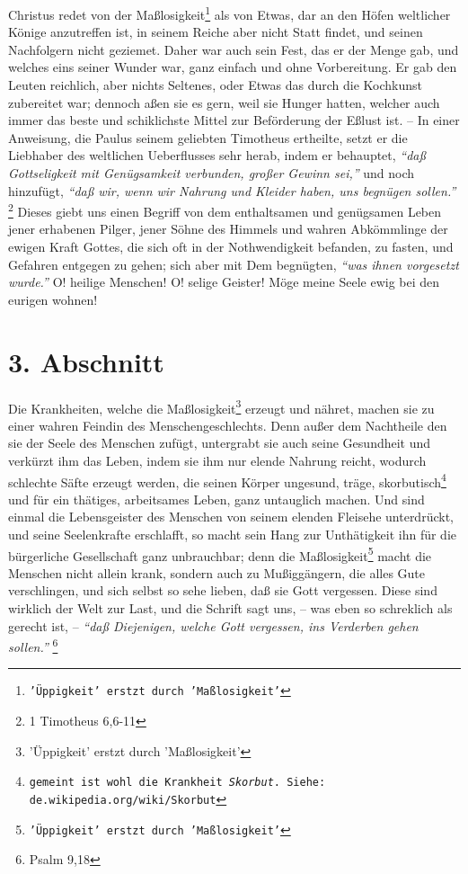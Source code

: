 \medskip

Christus redet von der Maßlosigkeit\footnote{\texttt{'Üppigkeit' erstzt durch 'Maßlosigkeit'}} als von Etwas, dar an den Höfen weltlicher
Könige anzutreffen ist, in seinem Reiche aber nicht Statt findet, und seinen
Nachfolgern nicht geziemet. Daher war auch sein Fest, das er der Menge gab, und
welches eins seiner Wunder war, ganz einfach und ohne Vorbereitung. Er gab den
Leuten reichlich, aber nichts Seltenes, oder Etwas das durch die Kochkunst
zubereitet war; dennoch aßen sie es gern, weil sie Hunger hatten, welcher auch
immer das beste und schiklichste Mittel zur Beförderung der Eßlust ist. -- In
einer Anweisung, die Paulus seinem geliebten Timotheus ertheilte, setzt er die
Liebhaber des weltlichen Ueberflusses sehr herab, indem er behauptet,
\textit{"`daß Gottseligkeit mit Genügsamkeit verbunden, großer Gewinn sei,"'} und noch hinzufügt, \textit{"`daß wir, wenn wir Nahrung und Kleider haben, uns begnügen
sollen."'}
\footnote{1 Timotheus 6,6-11}
Dieses giebt uns einen Begriff von dem
enthaltsamen und genügsamen Leben jener erhabenen Pilger, jener Söhne des Himmels und wahren Abkömmlinge der ewigen Kraft Gottes, die sich oft in der
Nothwendigkeit befanden, zu fasten, und Gefahren entgegen zu gehen; sich aber
mit Dem begnügten, \textit{"`was ihnen vorgesetzt wurde."'} O! heilige Menschen! O!
selige Geister! Möge meine Seele ewig bei den eurigen wohnen!

\section{3. Abschnitt} \label{kap14_ab3}

Die Krankheiten, welche die Maßlosigkeit\footnote{'Üppigkeit' erstzt durch 'Maßlosigkeit'} erzeugt und nähret, machen sie zu einer
wahren Feindin des Menschengeschlechts. Denn außer dem Nachtheile den sie der
Seele des Menschen zufügt, untergrabt sie auch seine Gesundheit und verkürzt ihm
das Leben, indem sie ihm nur elende Nahrung reicht, wodurch schlechte Säfte
erzeugt werden, die seinen Körper ungesund, träge, skorbutisch\footnote{\texttt{gemeint ist
wohl die Krankheit \textit{Skorbut}. Siehe: de.wikipedia.org/wiki/Skorbut}} und für ein thätiges,
arbeitsames Leben, ganz untauglich machen. Und sind einmal die Lebensgeister des
Menschen von seinem elenden Fleisehe unterdrückt, und seine Seelenkrafte
erschlafft, so macht sein Hang zur Unthätigkeit ihn für die bürgerliche Gesellschaft ganz unbrauchbar; denn die Maßlosigkeit\footnote{\texttt{'Üppigkeit' erstzt durch 'Maßlosigkeit'}} macht die Menschen nicht
allein krank, sondern auch zu Mußiggängern, die alles Gute verschlingen, und
sich selbst so sehe lieben, daß sie Gott vergessen. Diese sind wirklich der Welt
zur Last, und die Schrift sagt uns, -- was eben so schreklich als gerecht ist,
-- \textit{"`daß Diejenigen, welche Gott vergessen, ins Verderben gehen
sollen."'}
\footnote{Psalm 9,18}

